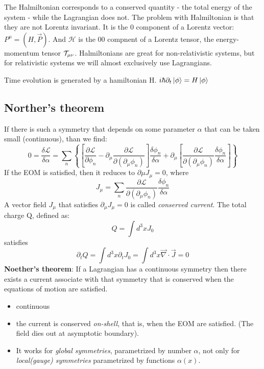 The Halmiltonian corresponds to a conserved quantity - the total energy of
the system - while the Lagrangian does not. The problem with Halmiltonian is
that they are not Lorentz invariant. It is the 0 component of a Lorentz
vector: $P^\mu = (H, \vec{P})$. And $\mathcal{H}$ is the 00 compnent of a
Lorentz tensor, the energy-momentum tensor $\mathcal{T}_{\mu\nu}$. Halmiltonians
are great for non-relativistic systems, but for relativistic systems we will
almost exclusively use Lagrangians.

Time evolution is generated by a hamiltonian H.
$i\hbar\partial_{t}\ket{\phi} = H\ket{\phi}$

\subsection{Norther's theorem}
If there is such a symmetry that depends on some parameter $\alpha$ that can
be taken small (continuous), than we find:
\[ 0 = \frac{\delta\mathcal{L}}{\delta\alpha} =
\displaystyle\sum_n\left\{ \left[\frac{\partial\mathcal{L}}{\partial{\phi_n}} - 
\partial_\mu\frac{\partial\mathcal{L}}{\partial(\partial_\mu\phi_n)}\right]\frac{\delta\phi_n}{\delta\alpha} 
+
\partial_\mu\left[\frac{\partial\mathcal{L}}{\partial(\partial_\mu\phi_n)}\frac{\delta\phi_n}{\delta\alpha}\right]
\right\} \]
If the EOM is satisfied, then it reduces to $\partial\mu J_\mu = 0$, where 
\begin{equation}
    \label{Norther current}
    J_\mu =
    \displaystyle\sum_n\frac{\partial\mathcal{L}}{\partial(\partial_\mu\phi_n)}\frac{\delta\phi_n}{\delta\alpha}
\end{equation}
A vector field $J_\mu$ that satisfies $\partial_\mu J_\mu = 0$ is called
\emph{conserved current}. The total charge Q, defined as: 
\[ Q = \int d^3xJ_0 \]
satisfies 
\[ \partial_{t}Q = \int d^3x\partial_{t}J_0 = \int
d^3x\vec{\nabla}\cdot\vec{J} = 0 \]
\textbf{Noether's theorem}: If a Lagrangian has a continuous symmetry then
there exists a current associate with that symmetry that is conserved when
the equations of motion are satisfied.
\begin{itemize}
    \item continuous
    \item the current is conserved \textit{on-shell}, that is, when the EOM
	are satisfied. (The field dies out at asymptotic boundary).
    \item It works for \textit{global symmetries}, parametrized by number
	$\alpha$, not only for \textit{local(gauge) symmetries} parametrized
	by functions $\alpha(x)$.
\end{itemize}

